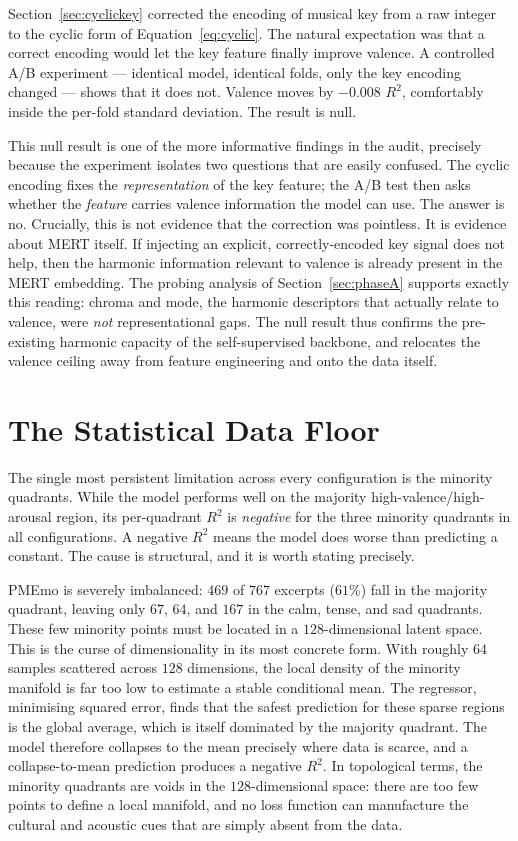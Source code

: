 \documentclass[12pt]{report}
\begin{document}
Section~\ref{sec:cyclickey} corrected the encoding of musical key from a raw integer to the cyclic form of Equation~\ref{eq:cyclic}. The natural expectation was that a correct encoding would let the key feature finally improve valence. A controlled A/B experiment --- identical model, identical folds, only the key encoding changed --- shows that it does not. Valence moves by $-0.008$ $R^{2}$, comfortably inside the per-fold standard deviation. The result is null.

This null result is one of the more informative findings in the audit, precisely because the experiment isolates two questions that are easily confused. The cyclic encoding fixes the \emph{representation} of the key feature; the A/B test then asks whether the \emph{feature} carries valence information the model can use. The answer is no. Crucially, this is not evidence that the correction was pointless. It is evidence about MERT itself. If injecting an explicit, correctly-encoded key signal does not help, then the harmonic information relevant to valence is already present in the MERT embedding. The probing analysis of Section~\ref{sec:phaseA} supports exactly this reading: chroma and mode, the harmonic descriptors that actually relate to valence, were \emph{not} representational gaps. The null result thus confirms the pre-existing harmonic capacity of the self-supervised backbone, and relocates the valence ceiling away from feature engineering and onto the data itself.

\section{The Statistical Data Floor}
\label{sec:results-floor}

The single most persistent limitation across every configuration is the minority quadrants. While the model performs well on the majority high-valence/high-arousal region, its per-quadrant $R^{2}$ is \emph{negative} for the three minority quadrants in all configurations. A negative $R^{2}$ means the model does worse than predicting a constant. The cause is structural, and it is worth stating precisely.

PMEmo is severely imbalanced: $469$ of $767$ excerpts ($61\%$) fall in the majority quadrant, leaving only $67$, $64$, and $167$ in the calm, tense, and sad quadrants. These few minority points must be located in a $128$-dimensional latent space. This is the curse of dimensionality in its most concrete form. With roughly $64$ samples scattered across $128$ dimensions, the local density of the minority manifold is far too low to estimate a stable conditional mean. The regressor, minimising squared error, finds that the safest prediction for these sparse regions is the global average, which is itself dominated by the majority quadrant. The model therefore collapses to the mean precisely where data is scarce, and a collapse-to-mean prediction produces a negative $R^{2}$. In topological terms, the minority quadrants are voids in the $128$-dimensional space: there are too few points to define a local manifold, and no loss function can manufacture the cultural and acoustic cues that are simply absent from the data.
\end{document}
